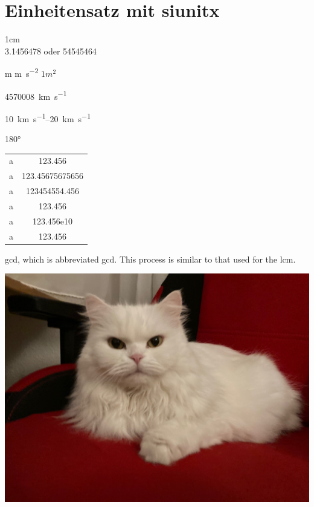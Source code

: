 \documentclass[ngerman,12pt]{scrreprt}
\begin{document}
\chapter{Einheitensatz mit siunitx}

1cm \\

\num{3,1456478} oder \num{54545464}

\si{m} \si{m\per \second^2} $1m^2$

\SI{4570008}{\kilo\meter\per\second}

\SIrange{10}{20}{\kilo\meter\per\second}

\ang{180}


\vspace*{2cm}
\begin{tabular}{rS}
a & 123.456 \\
a & 123.45675675656 \\
a & 123454554.456 \\
a & 123.456 \\
a & 123.456e10 \\
a & 123.456 \\
\end{tabular}

\acrlong{gcd}, which is abbreviated \acrshort{gcd}. This 
process is similar to that used for the \acrfull{lcm}.

\printglossary[type=\acronymtype]

\includegraphics[width=\textwidth,trim=2cm 55mm 22mm 7cm]{Katze2}
\end{document}
